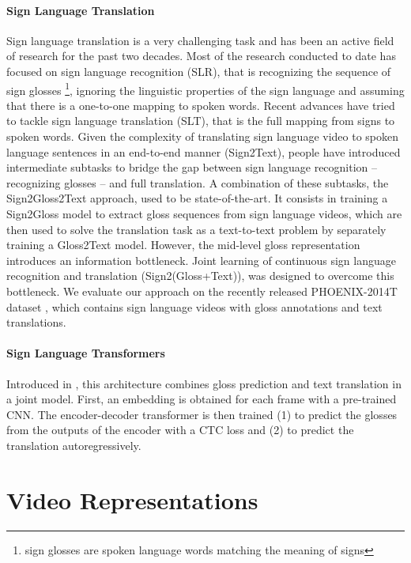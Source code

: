 \documentclass[final]{cvpr}
\begin{document}
\paragraph{Sign Language Translation}Sign language translation is a very challenging task and has been an active field of
research for the past two decades. Most of the research conducted to date has focused on sign language recognition (SLR), that is recognizing the sequence of sign glosses \footnote{sign glosses are spoken language words matching the meaning of signs}, ignoring the linguistic properties of the sign language and assuming that there is a one-to-one mapping to spoken words. Recent advances have tried to tackle sign language translation (SLT), that is the full mapping from signs to spoken words.
Given the complexity of translating sign language video to spoken language sentences in an end-to-end manner (Sign2Text), people have introduced intermediate subtasks to bridge the gap between sign language recognition -- recognizing glosses -- and full translation. A combination of these subtasks, the Sign2Gloss2Text approach, used to be state-of-the-art. It consists in training a Sign2Gloss model to extract gloss sequences from sign language videos, which are then used to solve the translation task as a text-to-text problem by separately training a Gloss2Text model. However, the mid-level gloss representation introduces an information bottleneck. Joint learning of continuous sign language recognition and translation (Sign2(Gloss+Text)), was designed to overcome this bottleneck. We evaluate our approach on the recently released PHOENIX-2014T dataset \cite{phoenix}, which contains sign language videos with gloss annotations and text translations.
\paragraph{Sign Language Transformers}
Introduced in \cite{neccam}, this architecture combines gloss prediction and text translation in a joint model. First, an embedding is obtained for each frame with a pre-trained CNN. The encoder-decoder transformer is then trained (1) to predict the glosses from the outputs of the encoder with a CTC loss and (2) to predict the translation autoregressively.

\section{Video Representations}
\end{document}
